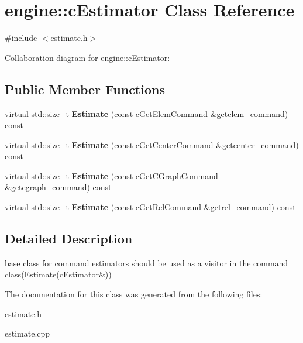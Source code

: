 \hypertarget{classengine_1_1cEstimator}{\section{engine\-:\-:c\-Estimator Class Reference}
\label{classengine_1_1cEstimator}
}


{\ttfamily \#include $<$estimate.\-h$>$}



Collaboration diagram for engine\-:\-:c\-Estimator\-:
\subsection*{Public Member Functions}
\begin{DoxyCompactItemize}
\item 
\hypertarget{classengine_1_1cEstimator_a6d2c3458e2ce412c10a355d651d9b98f}{virtual std\-::size\-\_\-t {\bfseries Estimate} (const \hyperlink{classengine_1_1cGetElemCommand}{c\-Get\-Elem\-Command} \&getelem\-\_\-command) const }\label{classengine_1_1cEstimator_a6d2c3458e2ce412c10a355d651d9b98f}

\item 
\hypertarget{classengine_1_1cEstimator_af6bcdcbb321c9d700571cf6fa1c06925}{virtual std\-::size\-\_\-t {\bfseries Estimate} (const \hyperlink{classengine_1_1cGetCenterCommand}{c\-Get\-Center\-Command} \&getcenter\-\_\-command) const }\label{classengine_1_1cEstimator_af6bcdcbb321c9d700571cf6fa1c06925}

\item 
\hypertarget{classengine_1_1cEstimator_add065c4c480b539c47b53195d6426764}{virtual std\-::size\-\_\-t {\bfseries Estimate} (const \hyperlink{classengine_1_1cGetCGraphCommand}{c\-Get\-C\-Graph\-Command} \&getcgraph\-\_\-command) const }\label{classengine_1_1cEstimator_add065c4c480b539c47b53195d6426764}

\item 
\hypertarget{classengine_1_1cEstimator_a8b24ad32a6c43c3230c2326e78659717}{virtual std\-::size\-\_\-t {\bfseries Estimate} (const \hyperlink{classengine_1_1cGetRelCommand}{c\-Get\-Rel\-Command} \&getrel\-\_\-command) const }\label{classengine_1_1cEstimator_a8b24ad32a6c43c3230c2326e78659717}

\end{DoxyCompactItemize}


\subsection{Detailed Description}
base class for command estimators should be used as a visitor in the command class(Estimate(c\-Estimator\&)) 

The documentation for this class was generated from the following files\-:\begin{DoxyCompactItemize}
\item 
estimate.\-h\item 
estimate.\-cpp\end{DoxyCompactItemize}

